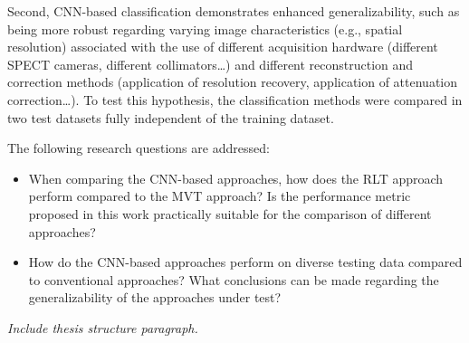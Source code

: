 Second, CNN-based classification demonstrates enhanced generalizability, such as being more robust regarding varying image characteristics 
(e.g., spatial resolution) 
associated with the use of different acquisition hardware 
(different SPECT cameras, different collimators\dots) 
and different reconstruction and correction methods (application of resolution recovery, application of attenuation correction\dots). 
To test this hypothesis, the classification methods were compared in two test datasets fully independent of the training dataset.


The following research questions are addressed: 
\begin{itemize}
    \item When comparing the CNN-based approaches, how does the RLT approach perform compared to the MVT approach? 
    Is the performance metric proposed in this work practically suitable for the comparison of different approaches?

    \item How do the CNN-based approaches perform on diverse testing data compared to conventional approaches?
    What conclusions can be made regarding the generalizability of the approaches under test?
    
\end{itemize}


\textit{Include thesis structure paragraph.}

